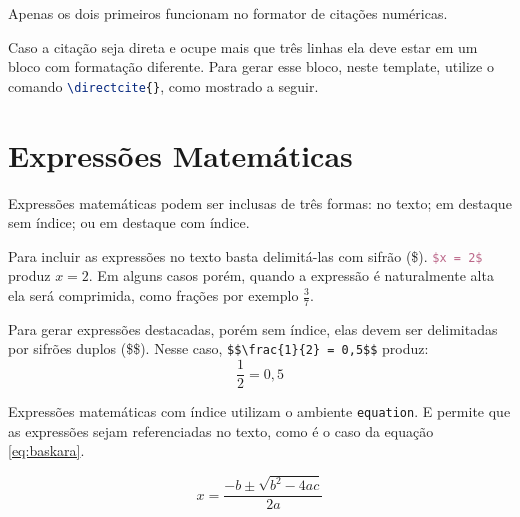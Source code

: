     Apenas os dois primeiros funcionam no formator de citações numéricas.

    Caso a citação seja direta e ocupe mais que três linhas ela deve estar em um bloco com formatação diferente.
    Para gerar esse bloco, neste template, utilize o comando \lstinline[language=TeX,style=code]|\directcite{}|, como mostrado a seguir.




\section{Expressões Matemáticas}
\label{sec:exmatematicas}

    Expressões matemáticas podem ser inclusas de três formas:
    no texto; em destaque sem índice; ou em destaque com índice.


    Para incluir as expressões no texto basta delimitá-las com sifrão (\$).
    \lstinline[language=TeX,style=code]|$x = 2$| produz $x = 2$.
    Em alguns casos porém, quando a expressão é naturalmente alta ela será comprimida, como frações por exemplo $\frac{3}{7}$.


    Para gerar expressões destacadas, porém sem índice, elas devem ser delimitadas por sifrões duplos (\$\$).
    Nesse caso, \lstinline[language=teX,style=code]|$$\frac{1}{2} = 0,5$$| produz:
    $$\frac{1}{2} = 0,5$$


    Expressões matemáticas com índice utilizam o ambiente \lstinline[language=TeX,style=code]|equation|.
    E permite que as expressões sejam referenciadas no texto, como é o caso da equação \ref{eq:baskara}.

    \begin{equation}
        x = \frac{-b \pm \sqrt{b^2 - 4ac}}{2a}
        \label{eq:baskara}
    \end{equation}